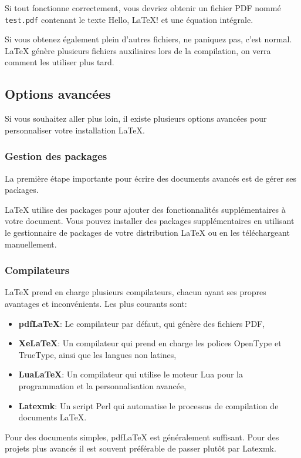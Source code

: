Si tout fonctionne correctement, vous devriez obtenir un fichier PDF nommé \texttt{test.pdf} contenant le texte \og{}Hello, LaTeX!\fg{} et une équation intégrale.

Si vous obtenez également plein d'autres fichiers, ne paniquez pas, c'est normal.
LaTeX génère plusieurs fichiers auxiliaires lors de la compilation, on verra comment les utiliser plus tard.

\subsection{Options avancées}\label{subsec:advanced_options}

Si vous souhaitez aller plus loin, il existe plusieurs options avancées pour personnaliser votre installation LaTeX.

\subsubsection{Gestion des packages}\label{subsubsec:package_management}

La première étape importante pour écrire des documents avancés est de gérer ses packages.

LaTeX utilise des packages pour ajouter des fonctionnalités supplémentaires à votre document.
Vous pouvez installer des packages supplémentaires en utilisant le gestionnaire de packages de votre distribution LaTeX
ou en les téléchargeant manuellement.

\subsubsection{Compilateurs}\label{subsubsec:compilers}

LaTeX prend en charge plusieurs compilateurs, chacun ayant ses propres avantages et inconvénients.
Les plus courants sont:

\begin{itemize}
    \item \textbf{pdfLaTeX}: Le compilateur par défaut, qui génère des fichiers PDF,
    \item \textbf{XeLaTeX}: Un compilateur qui prend en charge les polices OpenType et TrueType,
    ainsi que les langues non latines,
    \item \textbf{LuaLaTeX}: Un compilateur qui utilise le moteur Lua pour la programmation et la personnalisation avancée,
    \item \textbf{Latexmk}: Un script Perl qui automatise le processus de compilation de documents LaTeX.
\end{itemize}

Pour des documents simples, pdfLaTeX est généralement suffisant.
Pour des projets plus avancés il est souvent préférable de passer plutôt par Latexmk.